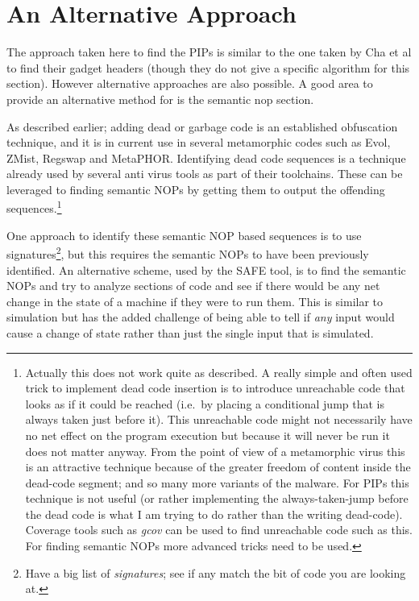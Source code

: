 \documentclass[10pt,]{book}
\begin{document}
\section{An Alternative Approach}

The approach taken here to find the PIPs is similar to the one taken by
Cha et al\autocite{Cha:2010uh} to find their gadget headers (though they
do not give a specific algorithm for this section). However alternative
approaches are also possible. A good area to provide an alternative
method for is the semantic nop section.

As described earlier; adding dead or garbage code is an established
obfuscation technique, and it is in current use in several metamorphic
codes such as Evol, ZMist, Regswap and
MetaPHOR\autocite{Borello:2008vx}. Identifying dead code sequences is a
technique already used by several anti virus tools as part of their
toolchains. These can be leveraged to finding semantic NOPs by getting
them to output the offending sequences.\footnote{Actually this does not
  work quite as described. A really simple and often used trick to
  implement dead code insertion is to introduce unreachable code that
  looks as if it could be reached (i.e.~by placing a conditional jump
  that is always taken just before it). This unreachable code might not
  necessarily have no net effect on the program execution but because it
  will never be run it does not matter anyway. From the point of view of
  a metamorphic virus this is an attractive technique because of the
  greater freedom of content inside the dead-code segment; and so many
  more variants of the malware. For PIPs this technique is not useful
  (or rather implementing the always-taken-jump before the dead code is
  what I am trying to do rather than the writing dead-code). Coverage
  tools such as \emph{gcov} can be used to find unreachable code such as
  this.\autocite{Administrator:ul} For finding semantic NOPs more
  advanced tricks need to be used.}

One approach to identify these semantic NOP based sequences is to use
signatures\footnote{Have a big list of \emph{signatures}; see if any
  match the bit of code you are looking at.}, but this requires the
semantic NOPs to have been previously identified. An alternative scheme,
used by the SAFE tool\autocite{Christodorescu:2006vz}, is to find the
semantic NOPs and try to analyze sections of code and see if there would
be any net change in the state of a machine if they were to run them.
This is similar to simulation but has the added challenge of being able
to tell if \emph{any} input would cause a change of state rather than
just the single input that is simulated.
\end{document}
